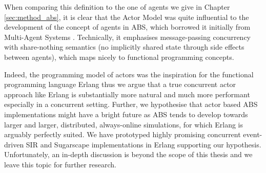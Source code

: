 When comparing this definition to the one of agents we give in Chapter \ref{sec:method_abs}, it is clear that the Actor Model was quite influential to the development of the concept of agents in ABS, which borrowed it initially from Multi-Agent Systems \cite{wooldridge_introduction_2009}. Technically, it emphasises message-passing concurrency with share-nothing semantics (no implicitly shared state through side effects between agents), which maps nicely to functional programming concepts.

Indeed, the programming model of actors \cite{agha_actors:_1986} was the inspiration for the functional programming language Erlang thus we argue that a true concurrent actor approach like Erlang is substantially more natural and much more performant especially in a concurrent setting. Further, we hypothesise that actor based ABS implementations might have a bright future as ABS tends to develop towards larger and larger, distributed, always-online simulations, for which Erlang is arguably perfectly suited. We have prototyped highly promising concurrent event-driven SIR and Sugarscape implementations in Erlang supporting our hypothesis. Unfortunately, an in-depth discussion is beyond the scope of this thesis and we leave this topic for further research.



%
